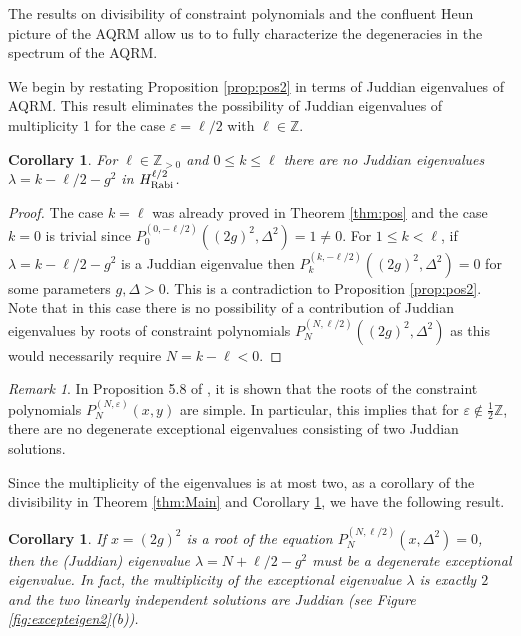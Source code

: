 \documentclass[11pt]{article}
\numberwithin{equation}{section}
\newcommand{\Z}{\mathbb{Z}} %
\newcommand{\e}{\varepsilon}
\newcommand{\HRabi}[1]{H_{\text{\upshape Rabi}}^{#1}} %
\newcommand{\cp}[2]{P^{(#1)}_{#2}} %
\newcommand{\QEDhere}{\pushQED{\qed}\qedhere\popQED}
\theoremstyle{plain}
\newtheorem{cor}[thm]{Corollary}
\theoremstyle{definition}
\theoremstyle{remark}
\newtheorem{rem}{Remark}[section]
\begin{document}
The results on divisibility of constraint polynomials and the confluent Heun picture of the AQRM allow us to 
to fully characterize the degeneracies in the spectrum of the AQRM.

We begin by restating Proposition \ref{prop:pos2} in terms of Juddian eigenvalues of AQRM. This result eliminates
the possibility of Juddian eigenvalues of multiplicity 1 for the case \(\e = \ell/2 \) with \(\ell \in \Z \).

\begin{cor} \label{cor:noNegJudd}
  For \(\ell \in \Z_{>0} \) and \( 0 \leq k \leq \ell  \) there are no Juddian eigenvalues \(\lambda = k - \ell/2 - g^2 \) in \(\HRabi{\ell/2}\).
\end{cor}

\begin{proof}
  The case \(k=\ell \) was already proved in Theorem \ref{thm:pos} and the case \(k=0\) is trivial since \(\cp{0,-\ell/2}{0}((2g)^2,\Delta^2) = 1 \not= 0 \).
  For \( 1 \leq  k < \ell \), if \( \lambda = k - \ell/2 - g^2 \) is a Juddian eigenvalue then \(\cp{k,-\ell/2}{k}((2g)^2,\Delta^2)=0 \) for some parameters
  \(g,\Delta >0\). This is a contradiction to Proposition \ref{prop:pos2}. Note that in this case there is no possibility of a contribution of Juddian
  eigenvalues by roots of constraint polynomials \(\cp{N,\ell/2}{N}((2g)^2,\Delta^2) \) as this would necessarily require \(N = k - \ell < 0\). 
\end{proof}

\begin{rem}
  In Proposition 5.8  of \cite{W2016JPA}, it is shown that the roots of the constraint polynomials \(\cp{N,\e}{N}(x,y)\) are simple.
  In particular, this implies that for \(\e \not\in \frac12 \Z \), there are no degenerate exceptional eigenvalues
  consisting of two Juddian solutions.
\end{rem}

Since the multiplicity of the eigenvalues is at most two, as a corollary of the divisibility
in Theorem \ref{thm:Main} and Corollary \ref{cor:noNegJudd}, we have the following result.

\begin{cor}\label{NoNonJudd}
  If $x=(2g)^2$ is a root of the equation $P_N^{(N, \ell/2)}(x, \Delta^2)=0$, then the (Juddian) eigenvalue $\lambda= N+\ell/2-g^2$
  must be a degenerate exceptional eigenvalue. In fact, the  multiplicity of the exceptional
  eigenvalue $\lambda$ is exactly $2$ and the two linearly independent solutions are Juddian (see Figure \ref{fig:excepteigen2}(b)). \QEDhere
\end{cor}
\end{document}
